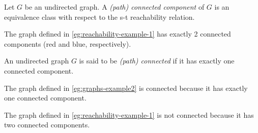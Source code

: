 \documentclass{amsart}
\begin{document}
\begin{defn}
  \label{defn:connected-components}
  Let $G$ be an undirected graph.
  A \emph{(path) connected component} of $G$ is an equivalence class with respect to the s-t reachability relation.
\end{defn}

\begin{eg}
  \label{eg:connected-components-example-1}
  The graph defined in \cref{eg:reachability-example-1} has exactly 2 connected components (red and blue, respectively).
  \begin{center}
  \end{center}
\end{eg}

\begin{defn}
  \label{defn:connected-graphs}
  An undirected graph $G$ is said to be \emph{(path) connected} if it has exactly one connected component.
\end{defn}

\begin{eg}
  \label{eg:connected-graphs-example-1}
  The graph defined in \cref{eg:graphs-example2} is connected because it has exactly one connected component.
\end{eg}

\begin{ceg}
  \label{ceg:connected-graphs-nonexample-1}
  The graph defined in \cref{eg:reachability-example-1} is not connected because it has two connected components.
\end{ceg}
\end{document}
